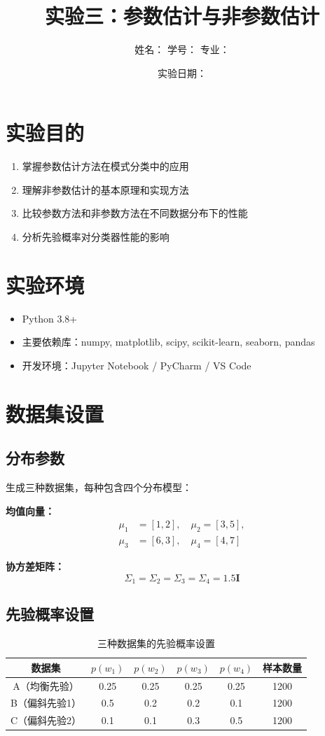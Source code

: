 \documentclass[12pt]{article}
\title{实验三：参数估计与非参数估计}
\author{姓名：\underline{\hspace{3cm}} \quad 学号：\underline{\hspace{3cm}} \quad 专业：\underline{\hspace{3cm}}}
\date{实验日期：}
\begin{document}
\maketitle

\section{实验目的}
\begin{enumerate}
    \item 掌握参数估计方法在模式分类中的应用
    \item 理解非参数估计的基本原理和实现方法
    \item 比较参数方法和非参数方法在不同数据分布下的性能
    \item 分析先验概率对分类器性能的影响
\end{enumerate}

\section{实验环境}
\begin{itemize}
    \item Python 3.8+
    \item 主要依赖库：numpy, matplotlib, scipy, scikit-learn, seaborn, pandas
    \item 开发环境：Jupyter Notebook / PyCharm / VS Code
\end{itemize}

\section{数据集设置}
\subsection{分布参数}
生成三种数据集，每种包含四个分布模型：

\textbf{均值向量：}
\begin{align*}
\mu_1 &= [1, 2], \quad \mu_2 = [3, 5], \\
\mu_3 &= [6, 3], \quad \mu_4 = [4, 7]
\end{align*}

\textbf{协方差矩阵：}
\[
\Sigma_1 = \Sigma_2 = \Sigma_3 = \Sigma_4 = 1.5\mathbf{I}
\]

\subsection{先验概率设置}
\begin{table}[htbp]
\centering
\caption{三种数据集的先验概率设置}
\begin{tabular}{cccccc}
\toprule
数据集 & $p(w_1)$ & $p(w_2)$ & $p(w_3)$ & $p(w_4)$ & 样本数量 \\
\midrule
A（均衡先验） & 0.25 & 0.25 & 0.25 & 0.25 & 1200 \\
B（偏斜先验1） & 0.5 & 0.2 & 0.2 & 0.1 & 1200 \\
C（偏斜先验2） & 0.1 & 0.1 & 0.3 & 0.5 & 1200 \\
\bottomrule
\end{tabular}
\end{table}
\end{document}
